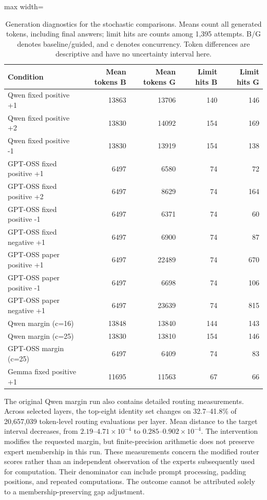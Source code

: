 \documentclass[12pt,a4paper,twoside,openright]{book}
\begin{document}
\begin{table}[!ht]
\centering\small
\caption{Generation diagnostics for the stochastic comparisons. Means count all generated tokens, including final answers; limit hits are counts among 1,395 attempts. B/G denotes baseline/guided, and c denotes concurrency. Token differences are descriptive and have no uncertainty interval here.}
\label{tab:res-tokens}
\begin{adjustbox}{max width=\linewidth}%
\begin{tabular}{lrrrr}
\toprule
Condition & Mean tokens B & Mean tokens G & Limit hits B & Limit hits G \\
\midrule
Qwen fixed positive +1 & 13863 & 13706 & 140 & 146 \\
Qwen fixed positive +2 & 13830 & 14092 & 154 & 169 \\
Qwen fixed positive -1 & 13830 & 13919 & 154 & 138 \\
GPT-OSS fixed positive +1 & 6497 & 6580 & 74 & 72 \\
GPT-OSS fixed positive +2 & 6497 & 8629 & 74 & 164 \\
GPT-OSS fixed positive -1 & 6497 & 6371 & 74 & 60 \\
GPT-OSS fixed negative +1 & 6497 & 6900 & 74 & 87 \\
GPT-OSS paper positive +1 & 6497 & 22489 & 74 & 670 \\
GPT-OSS paper positive -1 & 6497 & 6698 & 74 & 106 \\
GPT-OSS paper negative +1 & 6497 & 23639 & 74 & 815 \\
Qwen margin (c=16) & 13848 & 13840 & 144 & 143 \\
Qwen margin (c=25) & 13830 & 13810 & 154 & 146 \\
GPT-OSS margin (c=25) & 6497 & 6409 & 74 & 83 \\
Gemma fixed positive +1 & 11695 & 11563 & 67 & 66 \\
\bottomrule
\end{tabular}
\end{adjustbox}
\end{table}


The original Qwen margin run also contains detailed routing measurements. Across
selected layers, the top-eight identity set changes on 32.7--41.8\% of
20,657,039 token-level routing evaluations per layer. Mean distance to the target
interval decreases, from $2.19$--$4.71\times10^{-4}$ to
$0.285$--$0.902\times10^{-4}$. The intervention modifies the requested
margin, but finite-precision arithmetic does not preserve expert membership
in this run. These measurements concern the modified router scores rather
than an independent observation of the experts subsequently used for
computation. Their denominator can include prompt processing, padding
positions, and repeated computations. The outcome cannot be
attributed solely to a membership-preserving gap adjustment.
\end{document}
